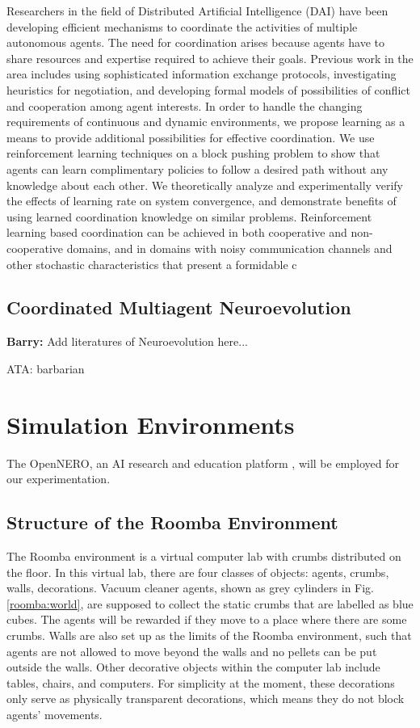 \documentclass[conference]{IEEEtran}
\begin{document}
\cite{sen1994learning}
Researchers in the field of Distributed Artificial
Intelligence (DAI) have been developing efficient
mechanisms to coordinate the activities of multiple
autonomous agents. The need for coordination
arises because agents have to share resources
and expertise required to achieve their goals.
Previous work in the area includes using sophisticated
information exchange protocols, investigating
heuristics for negotiation, and developing
formal models of possibilities of conflict and cooperation
among agent interests. In order to handle
the changing requirements of continuous and
dynamic environments, we propose learning as a
means to provide additional possibilities for effective
coordination. We use reinforcement learning
techniques on a block pushing problem to show
that agents can learn complimentary policies to
follow a desired path without any knowledge
about each other. We theoretically analyze and
experimentally verify the effects of learning rate
on system convergence, and demonstrate benefits
of using learned coordination knowledge on similar
problems. Reinforcement learning based coordination
can be achieved in both cooperative and
non-cooperative domains, and in domains with
noisy communication channels and other stochastic
characteristics that present a formidable c

\subsection{Coordinated Multiagent Neuroevolution}
\textbf{Barry:}
Add literatures of Neuroevolution here...

ATA: barbarian


\section{Simulation Environments}
The OpenNERO, an AI research and education platform
\cite{karpov2008opennero}, will be employed for our experimentation.

\subsection{Structure of the Roomba Environment}
The Roomba environment is a virtual computer lab with crumbs distributed on
the floor.
In this virtual lab, there are four classes of objects: agents, crumbs, walls,
decorations. 
Vacuum cleaner agents, shown as grey cylinders in Fig. \ref{roomba:world}, are
supposed to collect the static crumbs that are labelled as blue cubes.  
The agents will be rewarded if they move to a place where there are some
crumbs. 
Walls are also set up as the limits of the Roomba environment, such that
agents are not allowed to move beyond the walls and no pellets can be put
outside the walls.
Other decorative objects within the computer lab include tables, chairs, and
computers. For simplicity at the moment, these decorations only serve as
physically transparent decorations, which means they do not block agents' movements.
\end{document}
